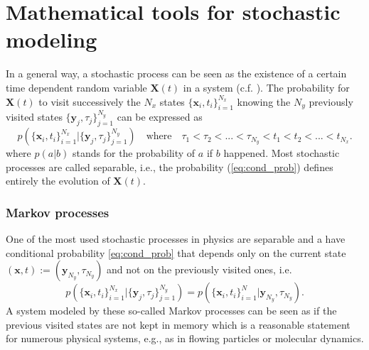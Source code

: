 \section{Mathematical tools for stochastic modeling}
In a general way, a stochastic process can be seen as the existence of a certain time dependent random variable $\textbf{X}(t)$ in a system (c.f. \citet[Sec. 3.1]{Gardiner1996}). The probability for $\textbf{X}(t)$ to visit successively the $N_x$ states $\{\textbf{x}_i,t_i\}_{i=1}^{N_x}$ knowing the $N_y$ previously visited states $\{\textbf{y}_j,\tau_j\}_{j=1}^{N_y}$  can be expressed as
\begin{equation}\label{eq:cond_prob}
p(\{\textbf{x}_i,t_i\}_{i=1}^{N_x}|\{\textbf{y}_j,\tau_j\}_{j=1}^{N_y})\quad\textrm{where}\quad \tau_1<\tau_2<...<\tau_{N_y}<t_1<t_2<...<t_{N_x}.
\end{equation}
where $p(a|b)$ stands for the probability of $a$ if $b$ happened.
Most stochastic processes are called separable, i.e., the probability (\ref{eq:cond_prob}) defines entirely the evolution of $\textbf{X}(t)$.

\subsubsection{Markov processes}
One of the most used stochastic processes in physics are separable and a have conditional probability \eqref{eq:cond_prob} that depends only on the current state $(\textbf{x},t):=(\textbf{y}_{N_y},\tau_{N_y})$ and not on the previously visited ones, i.e. 
\[
p(\{\textbf{x}_i,t_i\}_{i=1}^{N_x}|\{\textbf{y}_j,\tau_j\}_{j=1}^{N_y})=p(\{\textbf{x}_i,t_i\}_{i=1}^N|\textbf{y}_{N_y},\tau_{N_y}).
\]
A system modeled by these so-called Markov processes can be seen as if the previous visited states are not kept in memory which is a reasonable statement for numerous physical systems, e.g., as in flowing particles or molecular dynamics.

